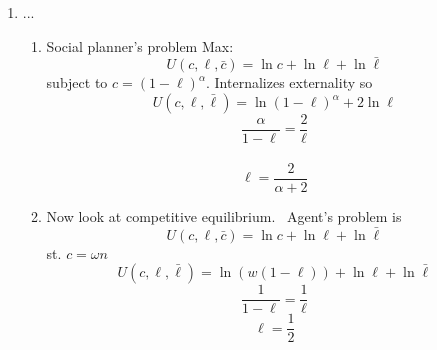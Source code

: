 \documentclass{article}
\begin{document}
\begin{enumerate}
\item ...

\begin{enumerate}
\item Social planner's problem Max:%
\begin{equation*}
U\left( c,\ell ,\bar{c}\right) =\ln c+\ln \ell +\ln \bar{\ell}
\end{equation*}%
subject to $c=\left( 1-\ell \right) ^{\alpha }.$ Internalizes externality so 
\begin{equation*}
U\left( c,\ell ,\bar{\ell}\right) =\ln \left( 1-\ell \right) ^{\alpha }+2\ln
\ell 
\end{equation*}%
\begin{equation*}
\frac{\alpha }{1-\ell }=\frac{2}{\ell }
\end{equation*}%
$\allowbreak $%
\begin{equation*}
\ell =\frac{2}{\alpha +2}
\end{equation*}

\item Now look at competitive equilibrium. \ Agent's problem is 
\begin{equation*}
U\left( c,\ell ,\bar{c}\right) =\ln c+\ln \ell +\ln \bar{\ell}
\end{equation*}%
st. $c=\omega n$ 
\begin{equation*}
U\left( c,\ell ,\bar{\ell}\right) =\ln \left( w\left( 1-\ell \right) \right)
+\ln \ell +\ln \bar{\ell}
\end{equation*}%
\begin{equation*}
\frac{1}{1-\ell }=\frac{1}{\ell }
\end{equation*}%
\begin{equation*}
\ell =\frac{1}{2}
\end{equation*}


\end{enumerate}
\end{enumerate}
\end{document}
